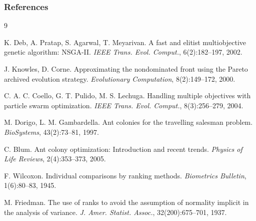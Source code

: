 \documentclass[aspectratio=169,10pt]{beamer}
\begin{document}
\begin{frame}
\frametitle{References}

\small
\begin{thebibliography}{9}

K. Deb, A. Pratap, S. Agarwal, T. Meyarivan.
\newblock A fast and elitist multiobjective genetic algorithm: NSGA-II.
\newblock \emph{IEEE Trans. Evol. Comput.}, 6(2):182--197, 2002.

J. Knowles, D. Corne.
\newblock Approximating the nondominated front using the Pareto archived evolution strategy.
\newblock \emph{Evolutionary Computation}, 8(2):149--172, 2000.

C. A. C. Coello, G. T. Pulido, M. S. Lechuga.
\newblock Handling multiple objectives with particle swarm optimization.
\newblock \emph{IEEE Trans. Evol. Comput.}, 8(3):256--279, 2004.

M. Dorigo, L. M. Gambardella.
\newblock Ant colonies for the travelling salesman problem.
\newblock \emph{BioSystems}, 43(2):73--81, 1997.

C. Blum.
\newblock Ant colony optimization: Introduction and recent trends.
\newblock \emph{Physics of Life Reviews}, 2(4):353--373, 2005.

F. Wilcoxon.
\newblock Individual comparisons by ranking methods.
\newblock \emph{Biometrics Bulletin}, 1(6):80--83, 1945.

M. Friedman.
\newblock The use of ranks to avoid the assumption of normality implicit in the analysis of variance.
\newblock \emph{J. Amer. Statist. Assoc.}, 32(200):675--701, 1937.

\end{thebibliography}

\end{frame}
\end{document}
